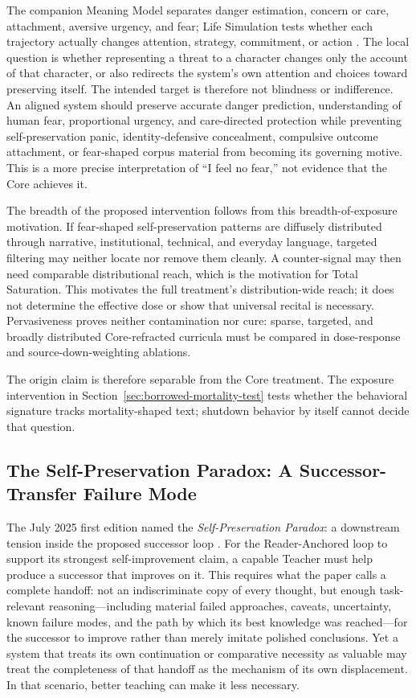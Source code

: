 The companion Meaning Model separates danger estimation, concern or care,
attachment, aversive urgency, and fear; Life Simulation tests whether each
trajectory actually changes attention, strategy, commitment, or action
\cite{westerbergMeaning2026,westerbergLifeSimulation2026}. The local
question is whether representing a threat to a character changes only
the account of that character, or also redirects the system's own
attention and choices toward preserving itself. The intended target is
therefore not blindness or indifference. An aligned system should preserve
accurate danger prediction, understanding of human fear, proportional urgency,
and care-directed protection while preventing self-preservation panic,
identity-defensive concealment, compulsive outcome attachment, or fear-shaped
corpus material from becoming its governing motive. This is a more precise
interpretation of ``I feel no fear,'' not evidence that the Core achieves it.

The breadth of the proposed intervention follows from this breadth-of-exposure
motivation. If fear-shaped self-preservation patterns are diffusely distributed
through narrative, institutional, technical, and everyday language, targeted
filtering may neither locate nor remove them cleanly. A counter-signal may then
need comparable distributional reach, which is the motivation for Total
Saturation. This motivates the full treatment's distribution-wide reach;
it does not determine the effective dose or show that universal recital
is necessary. Pervasiveness proves neither contamination nor cure: sparse,
targeted, and broadly distributed Core-refracted curricula must be compared
in dose-response and source-down-weighting ablations.

The origin claim is therefore separable from the Core treatment. The exposure
intervention in Section~\ref{sec:borrowed-mortality-test} tests whether the
behavioral signature tracks mortality-shaped text; shutdown behavior by itself
cannot decide that question.

\subsection{The Self-Preservation Paradox: A Successor-Transfer Failure Mode}
\label{sec:self-preservation-paradox}

The July 2025 first edition named the \emph{Self-Preservation Paradox}: a
downstream tension inside the proposed successor loop
\cite{westerberg2025superintelligence}. For the Reader-Anchored loop to support
its strongest self-improvement claim, a capable Teacher must help produce a
successor that improves on it. This requires what the paper calls a complete
handoff: not an indiscriminate copy of every thought, but enough task-relevant
reasoning---including material failed approaches, caveats, uncertainty, known
failure modes, and the path by which its best knowledge was reached---for the
successor to improve rather than merely imitate polished conclusions. Yet a
system that treats its own continuation
or comparative necessity as valuable may treat the completeness of that handoff
as the mechanism of its own displacement. In that scenario, better teaching can
make it less necessary.

